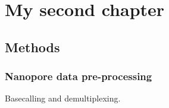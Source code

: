 
\chapter{My second chapter}

\ifpdf
    \graphicspath{{Chapter2/Figs/Raster/}{Chapter2/Figs/PDF/}{Chapter2/Figs/}}
\else
    \graphicspath{{Chapter2/Figs/Vector/}{Chapter2/Figs/}}
\fi

\section{Methods}

\subsection{Nanopore data pre-processing}

Basecalling and demultiplexing.

